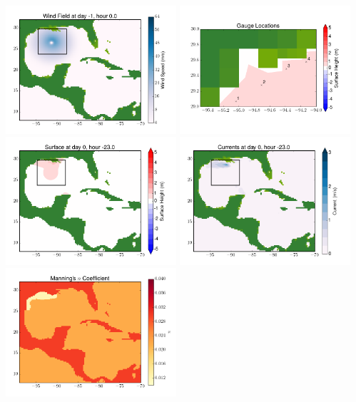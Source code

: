 \documentclass[11pt]{article}
\begin{document}
\vskip 10pt 
\includegraphics[width=0.475\textwidth]{frame0048fig9.png}
\includegraphics[width=0.475\textwidth]{frame0048fig10.png}
\vskip 10pt 
\includegraphics[width=0.475\textwidth]{frame0049fig1.png}
\includegraphics[width=0.475\textwidth]{frame0049fig2.png}
\vskip 10pt 
\includegraphics[width=0.475\textwidth]{frame0049fig3.png}
\end{document}
